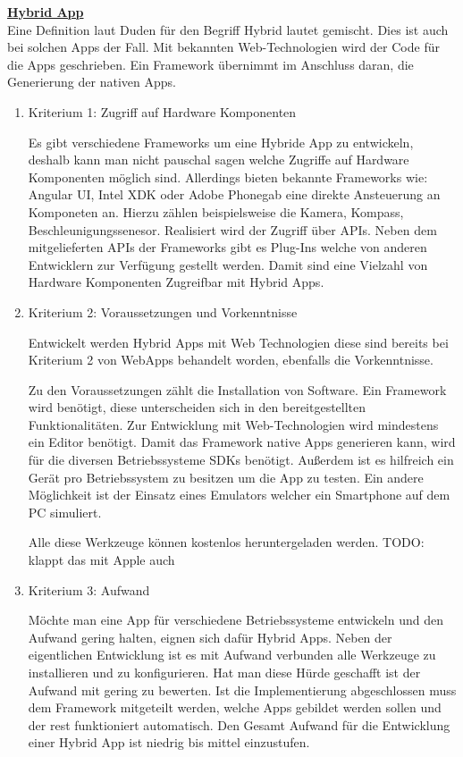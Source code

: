 \textbf{\underline{Hybrid App}}\\
Eine Definition laut Duden für den Begriff Hybrid lautet gemischt. Dies ist auch bei solchen Apps der Fall. Mit bekannten Web-Technologien wird der Code für die Apps geschrieben. Ein Framework übernimmt im Anschluss daran, die Generierung der nativen Apps.  
\begin{enumerate}
\item Kriterium 1: Zugriff auf Hardware Komponenten

Es gibt verschiedene Frameworks um eine Hybride App zu entwickeln, deshalb kann man nicht pauschal sagen welche Zugriffe auf Hardware Komponenten möglich sind. Allerdings bieten bekannte Frameworks wie: Angular UI, Intel XDK oder Adobe Phonegab eine direkte Ansteuerung an Komponeten an. Hierzu zählen beispielsweise die Kamera, Kompass, Beschleunigungssenesor. Realisiert wird der Zugriff über APIs. Neben dem mitgelieferten APIs der Frameworks gibt es Plug-Ins welche von anderen Entwicklern zur Verfügung gestellt werden. Damit sind eine Vielzahl von Hardware Komponenten Zugreifbar mit Hybrid Apps.

\item Kriterium 2: Voraussetzungen und Vorkenntnisse

Entwickelt werden Hybrid Apps mit Web Technologien diese sind bereits bei Kriterium 2 von WebApps behandelt worden, ebenfalls die Vorkenntnisse.

Zu den Voraussetzungen zählt die Installation von Software. Ein Framework wird benötigt, diese unterscheiden sich in den bereitgestellten Funktionalitäten. Zur Entwicklung mit Web-Technologien wird mindestens ein Editor benötigt. Damit das Framework native Apps generieren kann, wird für die diversen Betriebssysteme SDKs benötigt. Außerdem ist es hilfreich ein Gerät pro Betriebssystem zu besitzen um die App zu testen. Ein andere Möglichkeit ist der Einsatz eines Emulators welcher ein Smartphone auf dem PC simuliert.

Alle diese Werkzeuge können kostenlos heruntergeladen werden.
TODO: klappt das mit Apple auch


\item Kriterium 3: Aufwand

Möchte man eine App für verschiedene Betriebssysteme entwickeln und den Aufwand gering halten, eignen sich dafür Hybrid Apps. Neben der eigentlichen Entwicklung ist es mit Aufwand verbunden alle Werkzeuge zu installieren und zu konfigurieren. Hat man diese Hürde geschafft ist der Aufwand mit gering zu bewerten. Ist die Implementierung abgeschlossen muss dem Framework mitgeteilt werden, welche Apps gebildet werden sollen und der rest funktioniert automatisch. Den Gesamt Aufwand für die Entwicklung einer Hybrid App ist niedrig bis mittel einzustufen.
\end{enumerate}

